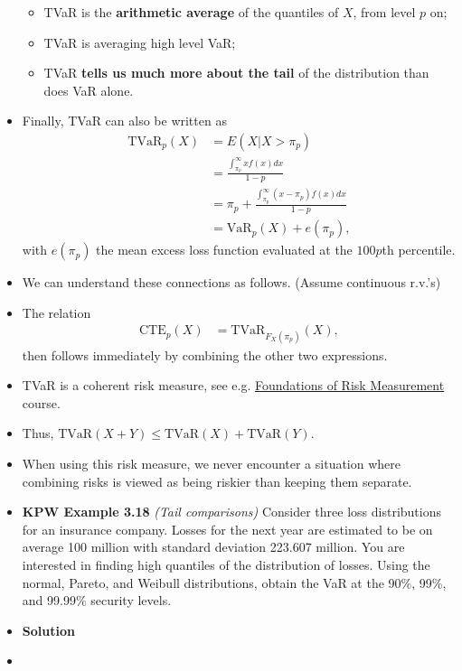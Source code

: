 \documentclass[]{book}
\theoremstyle{definition}
\theoremstyle{definition}
\theoremstyle{definition}
\theoremstyle{remark}
\begin{document}
\begin{itemize}
  \begin{itemize}
  \item
    TVaR is the \textbf{arithmetic average} of the quantiles of \(X\),
    from level \(p\) on;
  \item
    TVaR is averaging high level VaR;
  \item
    TVaR \textbf{tells us much more about the tail} of the distribution
    than does VaR alone.
  \end{itemize}
\item
  Finally, TVaR can also be written as \[\begin{aligned}
  \text{TVaR}_p(X) &= E(X|X>\pi_p) \\
  &= \frac{\int_{\pi_p}^{\infty} x f(x)dx}{1-p} \\
  &= \pi_p + \frac{\int_{\pi_p}^{\infty} (x-\pi_p) f(x) dx}{1-p} \\
  &= \text{VaR}_p(X) + e(\pi_p),\end{aligned}\] with \(e(\pi_p)\) the
  mean excess loss function evaluated at the \(100p\)th percentile.
\item
  We can understand these connections as follows. (Assume continuous
  r.v.'s)
\item
  The relation \[\begin{aligned}
  \text{CTE}_p(X) &= \text{TVaR}_{F_X(\pi_p)}(X),\end{aligned}\] then
  follows immediately by combining the other two expressions.
\item
  TVaR is a coherent risk measure, see e.g.
  \href{http://onderwijsaanbod.kuleuven.be/syllabi/e/D0R57BE.htm\#activetab=doelstellingen_idp1406608}{Foundations
  of Risk Measurement} course.
\item
  Thus, \(\text{TVaR}(X+Y) \leq \text{TVaR}(X)+\text{TVaR}(Y)\).
\item
  When using this risk measure, we never encounter a situation where
  combining risks is viewed as being riskier than keeping them separate.
\item
  \textbf{KPW Example 3.18} \emph{(Tail comparisons)} Consider three
  loss distributions for an insurance company. Losses for the next year
  are estimated to be on average 100 million with standard deviation
  223.607 million. You are interested in finding high quantiles of the
  distribution of losses. Using the normal, Pareto, and Weibull
  distributions, obtain the VaR at the 90\%, 99\%, and 99.99\% security
  levels.
\item
  \textbf{Solution}
\item

\end{itemize}
\end{document}
